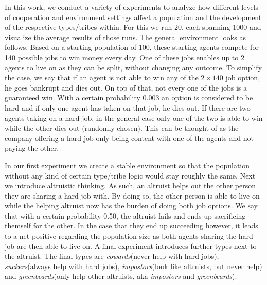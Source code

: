 \documentclass[sigconf]{acmart}
\newcommand{\todo}[1]{{\color{red}{#1}}}
\newcommand{\VNumSimulations}{20\xspace}
\newcommand{\VNumDays}{1000\xspace}
\newcommand{\VNumPop}{100\xspace}
\newcommand{\VNumTrees}{140\xspace}
\newcommand{\VProbPredator}{0.003\xspace}
\newcommand{\VProbAltruistDies}{0.50\xspace}
\newcommand{\cowards}{\textit{cowards}\xspace}
\newcommand{\suckers}{\textit{suckers}\xspace}
\newcommand{\impostors}{\textit{impostors}\xspace}
\newcommand{\greenbeards}{\textit{greenbeards}\xspace}
\begin{document}
    \todo{Indirect reciprocity}


    \todo{relate this to related work/experiments}

    In this work, we conduct a variety of experiments to analyze how different levels of cooperation and environment settings affect a population and the development of the respective types/tribes within.
    For this we run \VNumSimulations, each spanning \VNumDays and visualize the average results of those runs.
    The general environment looks as follows.
    Based on a starting population of \VNumPop, these starting agents compete for \VNumTrees possible jobs to win money every day.
    One of these jobs enables up to 2 agents to live on as they can be split, without changing any outcome.
    To simplify the case, we say that if an agent is not able to win any of the $2 \times \VNumTrees$ job option, he goes bankrupt and dies out.
    On top of that, not every one of the jobs is a guaranteed win.
    With a certain probability \VProbPredator an option is considered to be hard and if only one agent has taken on that job, he dies out.
    If there are two agents taking on a hard job, in the general case only one of the two is able to win while the other dies out (randomly chosen).
    This can be thought of as the company offering a hard job only being content with one of the agents and not paying the other.

    In our first experiment we create a stable environment so that the population without any kind of certain type/tribe logic would stay roughly the same.
    Next we introduce altruistic thinking.
    As such, an altruist helps out the other person they are sharing a hard job with.
    By doing so, the other person is able to live on while the helping altruist now has the burden of doing both job options.
    We say that with a certain probability \VProbAltruistDies, the altruist fails and ends up sacrificing themself for the other.
    In the case that they end up succeeding however, it leads to a net-positive regarding the population size as both agents sharing the hard job are then able to live on.
    A final experiment introduces further types next to the altruist.
    The final types are \cowards (never help with hard jobs), \suckers (always help with hard jobs), \impostors (look like altruists, but never help) and  \greenbeards (only help other altruists, aka \impostors and \greenbeards).
\end{document}
